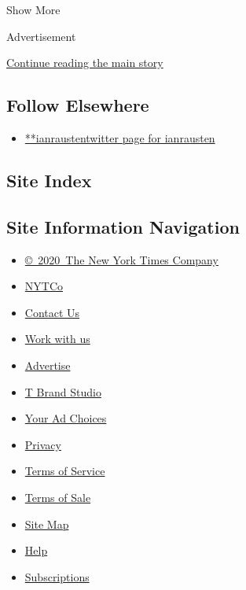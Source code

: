 Show More

Advertisement

\protect\hyperlink{after-mid2}{Continue reading the main story}

\hypertarget{follow-elsewhere}{%
\subsection{Follow Elsewhere}\label{follow-elsewhere}}

\begin{itemize}
\tightlist
\item
  \href{https://twitter.com/ianrausten}{**ianraustentwitter page for
  ianrausten}
\end{itemize}

\hypertarget{site-index}{%
\subsection{Site Index}\label{site-index}}

\hypertarget{site-information-navigation}{%
\subsection{Site Information
Navigation}\label{site-information-navigation}}

\begin{itemize}
\tightlist
\item
  \href{https://help.nytimes3xbfgragh.onion/hc/en-us/articles/115014792127-Copyright-notice}{©~2020~The
  New York Times Company}
\end{itemize}

\begin{itemize}
\tightlist
\item
  \href{https://www.nytco.com/}{NYTCo}
\item
  \href{https://help.nytimes3xbfgragh.onion/hc/en-us/articles/115015385887-Contact-Us}{Contact
  Us}
\item
  \href{https://www.nytco.com/careers/}{Work with us}
\item
  \href{https://nytmediakit.com/}{Advertise}
\item
  \href{http://www.tbrandstudio.com/}{T Brand Studio}
\item
  \href{https://www.nytimes3xbfgragh.onion/privacy/cookie-policy\#how-do-i-manage-trackers}{Your
  Ad Choices}
\item
  \href{https://www.nytimes3xbfgragh.onion/privacy}{Privacy}
\item
  \href{https://help.nytimes3xbfgragh.onion/hc/en-us/articles/115014893428-Terms-of-service}{Terms
  of Service}
\item
  \href{https://help.nytimes3xbfgragh.onion/hc/en-us/articles/115014893968-Terms-of-sale}{Terms
  of Sale}
\item
  \href{https://spiderbites.nytimes3xbfgragh.onion}{Site Map}
\item
  \href{https://help.nytimes3xbfgragh.onion/hc/en-us}{Help}
\item
  \href{https://www.nytimes3xbfgragh.onion/subscription?campaignId=37WXW}{Subscriptions}
\end{itemize}
